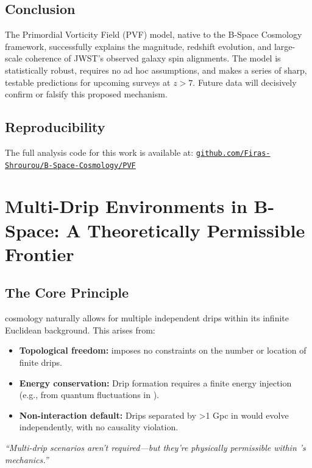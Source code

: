 \documentclass{BSpacePaper} %
\begin{document}
\begin{appendices}
\subsection{Conclusion}
The Primordial Vorticity Field (PVF) model, native to the B-Space Cosmology framework, successfully explains the magnitude, redshift evolution, and large-scale coherence of JWST's observed galaxy spin alignments. The model is statistically robust, requires no ad hoc assumptions, and makes a series of sharp, testable predictions for upcoming surveys at $z>7$. Future data will decisively confirm or falsify this proposed mechanism.

\subsection*{Reproducibility}
The full analysis code for this work is available at:
\href{https://github.com/Firas-Shrourou/B-Space-Cosmology/PVF}{\texttt{github.com/Firas-Shrourou/B-Space-Cosmology/PVF}}

\clearpage

\section{Multi-Drip Environments in B-Space: A Theoretically Permissible Frontier}
\label{app:multi_drip}
\setcounter{equation}{0}
\setcounter{table}{0}
\setcounter{figure}{0}

\subsection{The Core Principle}
\bspace{} cosmology naturally allows for multiple independent drips within its infinite Euclidean background. This arises from:
\begin{itemize}
    \item \textbf{Topological freedom:} \bspace{} imposes no constraints on the number or location of finite drips.
    \item \textbf{Energy conservation:} Drip formation requires a finite energy injection (e.g., from quantum fluctuations in \bspace{}).
    \item \textbf{Non-interaction default:} Drips separated by >1 Gpc in \bspace{} would evolve independently, with no causality violation.
\end{itemize}
\begin{center}
    \textit{``Multi-drip scenarios aren’t required—but they’re physically permissible within \bspace{}’s mechanics.''}
\end{center}


\end{appendices}
\end{document}

